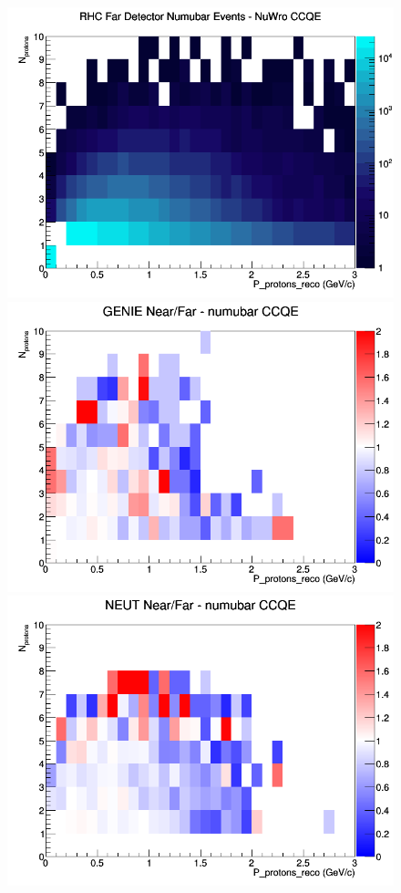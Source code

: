 \begin{figure}[h]
\endminipage
{}
\includegraphics[width=\linewidth]{eff_N_P/LAr/protons/CCQE_RHC_FD_numubar_N_P_NuWro.png}
\endminipage
\newline
{}
\includegraphics[width=\linewidth]{eff_N_P/LAr/protons/ratios/CCQE_GENIE_numubar_NF_N_P.png}
\endminipage
{}
\includegraphics[width=\linewidth]{eff_N_P/LAr/protons/ratios/CCQE_NEUT_numubar_NF_N_P.png}

\end{figure}
